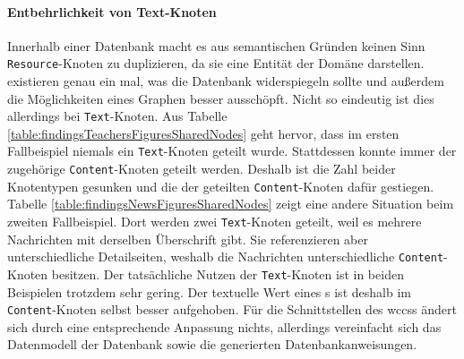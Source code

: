     \paragraph{Entbehrlichkeit von Text-Knoten}
    Innerhalb einer Datenbank macht es aus semantischen Gründen keinen Sinn
    \texttt{Resource}-Knoten zu duplizieren,
    da sie eine Entität der Domäne darstellen.
    {\resources} existieren genau ein mal, was die Datenbank widerspiegeln sollte
    und außerdem die Möglichkeiten eines Graphen besser ausschöpft.
    Nicht so eindeutig ist dies allerdings bei \texttt{Text}-Knoten.
    Aus Tabelle \ref{table:findingsTeachersFiguresSharedNodes} geht hervor,
    dass im ersten Fallbeispiel niemals ein \texttt{Text}-Knoten geteilt wurde.
    Stattdessen konnte immer der zugehörige \texttt{Content}-Knoten geteilt werden.
    Deshalb ist die Zahl beider Knotentypen gesunken und die der geteilten
    \texttt{Content}-Knoten dafür gestiegen.
    Tabelle \ref{table:findingsNewsFiguresSharedNodes}
    zeigt eine andere Situation beim zweiten Fallbeispiel.
    Dort werden zwei \texttt{Text}-Knoten geteilt,
    weil es mehrere Nachrichten mit derselben Überschrift gibt.
    Sie referenzieren aber unterschiedliche Detailseiten,
    weshalb die Nachrichten unterschiedliche \texttt{Content}-Knoten besitzen.
    Der tatsächliche Nutzen der \texttt{Text}-Knoten ist in beiden Beispielen trotzdem sehr gering.
    Der textuelle Wert eines {\contentFeature}s ist deshalb im \texttt{Content}-Knoten selbst besser aufgehoben.
    Für die Schnittstellen des \glspl{wccs} ändert sich durch eine entsprechende Anpassung nichts,
    allerdings vereinfacht sich das Datenmodell der Datenbank sowie
    die generierten Datenbankanweisungen.

